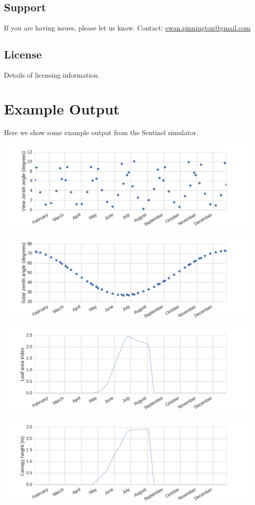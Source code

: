\documentclass[letterpaper,10pt,english]{sphinxmanual}
\begin{document}
\subsection{Support}
\label{source/README:support}
If you are having issues, please let us know.
Contact: \href{mailto:ewan.pinnington@gmail.com}{ewan.pinnington@gmail.com}


\subsection{License}
\label{source/README:license}
Details of licensing information.


\section{Example Output}
\label{source/example::doc}\label{source/example:example-output}
Here we show some example output from the Sentinel simulator.

\includegraphics{vza.png}

\includegraphics{sza.png}

\includegraphics{lai.png}

\includegraphics{can_ht.png}
\end{document}
